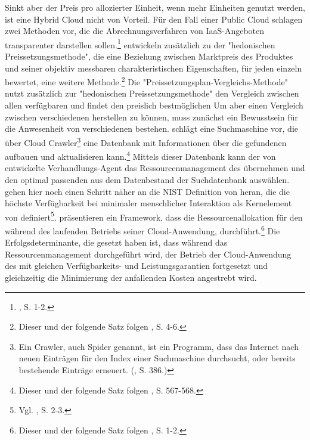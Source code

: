 \newline
Sinkt aber der Preis pro allozierter \CC Einheit, wenn mehr Einheiten genutzt werden, ist eine Hybrid Cloud nicht von Vorteil. Für den Fall einer Public Cloud schlagen \cite{ElKihal.2012} zwei Methoden vor, die die Abrechnungsverfahren von \acs{IaaS}-Angeboten transparenter darstellen sollen.\footnote{\cite{ElKihal.2012}, S. 1-2.}
\cite{ElKihal.2012} entwickeln zusätzlich zu der "hedonischen Preissetzungsmethode", die eine Beziehung zwischen Marktpreis des Produktes und seiner objektiv messbaren charakteristischen Eigenschaften, für jeden \CSP einzeln bewertet, eine weitere Methode.\footnote{Dieser und der folgende Satz folgen \cite{ElKihal.2012}, S. 4-6.}
Die "Preissetzungsplan-Vergleichs-Methode" nutzt zusätzlich zur "hedonischen Preissetzungsmethode" den Vergleich zwischen allen verfügbaren \CSPn und findet den preislich bestmöglichen \CSPDot
\newline
Um aber einen Vergleich zwischen verschiedenen \CSPn herstellen zu können, muss zunächst ein Bewusstsein für die Anwesenheit von verschiedenen \CSs bestehen. \cite{Sim.2012} schlägt eine \CS Suchmaschine vor, die über Cloud Crawler\footnote{Ein Crawler, auch Spider genannt, ist ein Programm, dass das Internet nach neuen Einträgen für den Index einer Suchmaschine durchsucht, oder bereits bestehende Einträge erneuert. (\cite{Laudon.2010}, S. 386.)}
eine Datenbank mit Informationen über die gefundenen \CSs aufbauen und aktualisieren kann.\footnote{Dieser und der folgende Satz folgen \cite{Sim.2012}, S. 567-568.}
Mittels dieser Datenbank kann der von \cite{Sim.2012} entwickelte Verhandlungs-Agent das Ressourcenmanagement des \CSUs übernehmen und den optimal passenden \CSP aus dem Datenbestand der \CS Suchdatenbank auswählen.
\newline
\cite{Addis.2013} gehen hier noch einen Schritt näher an die NIST Definition von \CC heran, die die höchste Verfügbarkeit bei minimaler menschlicher Interaktion als Kernelement von \CC definiert\footnote{Vgl. \cite{Mell.2011}, S. 2-3.}. \cite{Addis.2013} präsentieren ein Framework, dass die Ressourcenallokation für den \CSUComma während des laufenden Betriebs seiner Cloud-Anwendung, durchführt.\footnote{Dieser und der folgende Satz folgen \cite{Addis.2013}, S. 1-2.}
Die Erfolgsdeterminante, die \cite{Addis.2013} gesetzt haben ist, dass während das Ressourcenmanagement durchgeführt wird, der Betrieb der Cloud-Anwendung des \CSUs mit gleichen Verfügbarkeits- und Leistungsgarantien fortgesetzt und gleichzeitig die Minimierung der anfallenden Kosten angestrebt wird.
